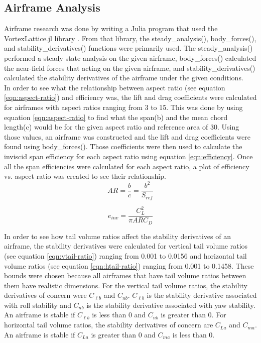 \documentclass[journal]{new-aiaa}
\begin{document}
	\subsection{Airframe Analysis}
	Airframe research was done by writing a Julia program that used the VortexLattice.jl library \cite{McDonnell-Ning}. From that library, the steady\_analysis(), body\_forces(), and stability\_derivatives() functions were primarily used. The steady\_analysis() performed a steady state analysis on the given airframe, body\_forces() calculated the near-field forces that acting on the given airframe, and stability\_derivatives() calculated the stability derivatives of the airframe under the given conditions.\\
	
	In order to see what the relationship between aspect ratio (see equation \ref{eqn:aspect-ratio}) and efficiency was, the lift and drag coefficients were calculated for airframes with aspect ratios ranging from 3 to 15. This was done by using equation \ref{eqn:aspect-ratio} to find what the span(b) and the mean chord length(c) would be for the given aspect ratio and reference area of 30. Using those values, an airframe was constructed and the lift and drag coefficients were found using body\_forces(). Those coefficients were then used to calculate the inviscid span efficiency for each aspect ratio using equation \ref{eqn:efficiency}. Once all the span efficiencies were calculated for each aspect ratio, a plot of efficiency vs. aspect ratio was created to see their relationship.\\
	
	\begin{equation}
		AR = \frac{b}{c} = \frac{b^2}{S_{ref}}
		\label{eqn:aspect-ratio}
	\end{equation}
	
	\begin{equation}
		e_{inv} = \frac{C_L^2}{\pi{ARC_D}}
		\label{eqn:efficiency}
	\end{equation}
	
	In order to see how tail volume ratios affect the stability derivatives of an airframe, the stability derivatives were calculated for vertical tail volume ratios (see equation \ref{eqn:vtail-ratio}) ranging from 0.001 to 0.0156 and horizontal tail volume ratios (see equation \ref{eqn:htail-ratio}) ranging from 0.001 to 0.1458. These bounds were chosen because all airframes that have tail volume ratios between them have realistic dimensions. For the vertical tail volume ratios, the stability derivatives of concern were \(C_{\ell{b}}\) and \(C_{nb}\). \(C_{\ell{b}}\) is the stability derivative associated with roll stability and \(C_{nb}\) is the stability derivative associated with yaw stability. An airframe is stable if \(C_{\ell{b}}\) is less than 0 and \(C_{nb}\) is greater than 0. For horizontal tail volume ratios, the stability derivatives of concern are \(C_{La}\) and \(C_{ma}\). An airframe is stable if \(C_{La}\) is greater than 0 and \(C_{ma}\) is less than 0.\\
	
\end{document}

